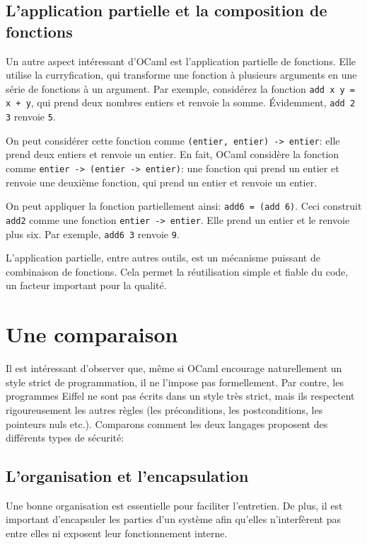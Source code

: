 \documentclass[french]{report}
\begin{document}
\section{L'application partielle et la composition de fonctions}

Un autre aspect intéressant d'OCaml est l'application partielle de \glspl{fonction}. Elle utilise la curryfication, qui transforme une \gls{fonction} à plusieurs arguments en une série de \glspl{fonction} à un argument. Par exemple, considérez la \gls{fonction} \texttt{add x y = x + y}, qui prend deux nombres entiers et renvoie la somme. Évidemment, \texttt{add 2 3} renvoie \texttt{5}.

On peut considérer cette \gls{fonction} comme \texttt{(entier, entier) -> entier}: elle prend deux entiers et renvoie un entier. En fait, OCaml considère la \gls{fonction} comme \texttt{entier -> (entier -> entier)}: une \gls{fonction} qui prend un entier et renvoie une deuxième fonction, qui prend un entier et renvoie un entier. 

On peut appliquer la \gls{fonction} partiellement ainsi: \texttt{add6 = (add 6)}. Ceci construit \texttt{add2} comme une \gls{fonction} \texttt{entier -> entier}. Elle prend un entier et le renvoie plus six. Par exemple, \texttt{add6 3} renvoie \texttt{9}.

L'application partielle, entre autres outils, est un mécanisme puissant de combinaison de \glspl{fonction}. Cela permet la réutilisation simple et fiable du code, un facteur important pour la qualité.

\chapter{Une comparaison}

Il est intéressant d'observer que, même si OCaml encourage naturellement un style strict de programmation, il ne l'impose pas formellement. Par contre, les programmes Eiffel ne sont pas écrits dans un style très strict, mais ils respectent rigoureusement les autres règles (les préconditions, les postconditions, les pointeurs nuls etc.). Comparons comment les deux langages proposent des différents types de sécurité:

\section{L'organisation et l'\gls{encapsulation}}

Une bonne organisation est essentielle pour faciliter l'entretien. De plus, il est important d'encapsuler les parties d'un système afin qu'elles n'interfèrent pas entre elles ni exposent leur fonctionnement interne.
\end{document}
